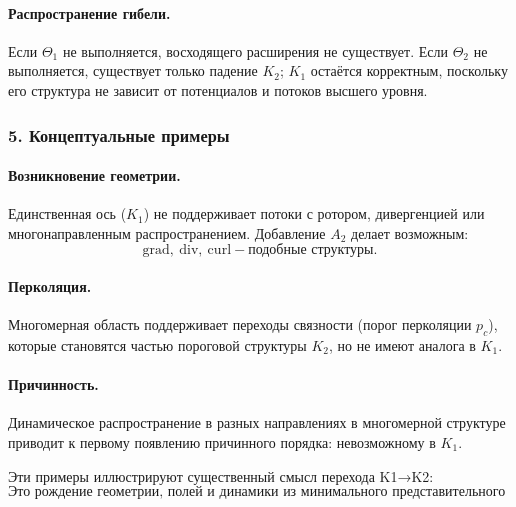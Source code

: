 \paragraph{Распространение гибели.}
Если $\Theta_1$ не выполняется, восходящего расширения не существует.
Если $\Theta_2$ не выполняется, существует только падение $K_2$; $K_1$
остаётся корректным, поскольку его структура не зависит от потенциалов и потоков
высшего уровня.

\subsubsection{5. Концептуальные примеры}

\paragraph{Возникновение геометрии.}
Единственная ось ($K_1$) не поддерживает потоки с ротором, дивергенцией или
многонаправленным распространением. Добавление $A_2$ делает возможным:
\[
\mathrm{grad},\ \mathrm{div},\ \mathrm{curl}-\text{подобные структуры}.
\]

\paragraph{Перколяция.}
Многомерная область поддерживает переходы связности (порог перколяции $p_c$),
которые становятся частью пороговой структуры $K_2$, но не имеют аналога в
$K_1$.

\paragraph{Причинность.}
Динамическое распространение в разных направлениях в многомерной структуре
приводит к первому появлению причинного порядка: невозможному в $K_1$.

Эти примеры иллюстрируют существенный смысл перехода K1→K2:
\[
\textbf{Это рождение геометрии, полей и динамики из минимального
представительного континуума.}
\]
